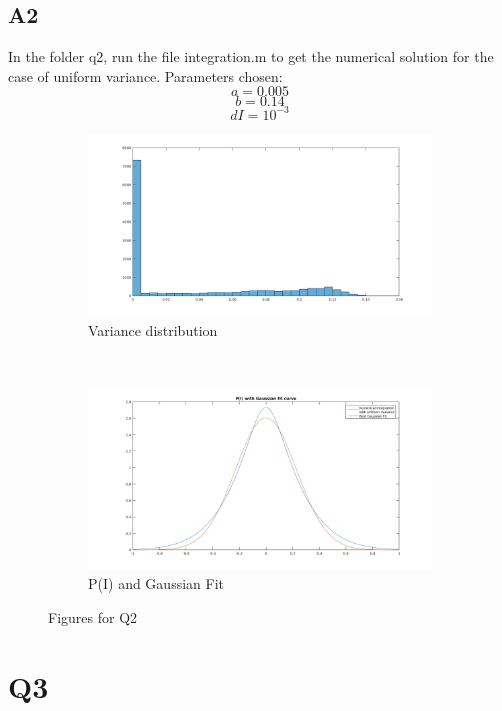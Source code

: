 \documentclass{article}
\begin{document}
\subsection*{A2}
In the folder q2, run the file integration.m to get the numerical solution for the case of uniform variance.
Parameters chosen:
$$a=0.005$$
$$b=0.14$$
$$dI = 10^{-3}$$
\begin{figure}[h!]
  \begin{subfigure}[t]{0.5\textwidth}
    \includegraphics[scale=0.4]{images/variance_distribution_d5}
    \caption{Variance distribution}
    \label{Fig :2a}
  \end{subfigure}\\
  \begin{subfigure}[t]{0.5\textwidth}
    \includegraphics[scale=0.4]{images/uniform_var_gaussian_fit}
    \caption{P(I) and Gaussian Fit}
    \label{Fig :2b}
  \end{subfigure}
  \caption{Figures for Q2}
\end{figure}
\pagebreak
\section*{Q3}
\end{document}
